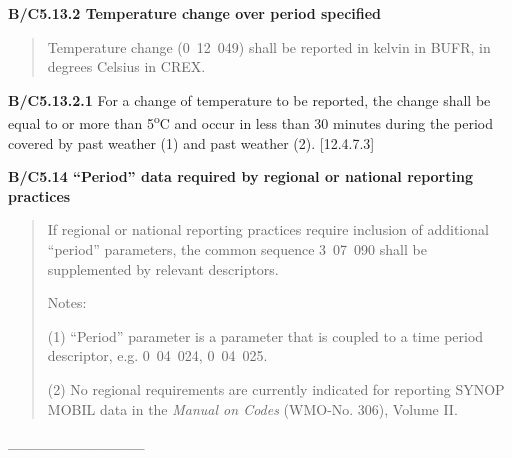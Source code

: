 \textbf{B/C5.13.2 Temperature change over period specified}

\begin{quote}
Temperature change (0~12~049) shall be reported in kelvin in BUFR, in degrees Celsius in CREX.
\end{quote}

\textbf{B/C5.13.2.1} For a change of temperature to be reported, the change shall be equal to or more than 5\textsuperscript{o}C and occur in less than 30 minutes during the period covered by past weather (1) and past weather (2). {[}12.4.7.3{]}

\textbf{B/C5.14 ``Period'' data required by regional or national reporting practices}

\begin{quote}
If regional or national reporting practices require inclusion of additional ``period'' parameters, the common sequence 3~07~090 shall be supplemented by relevant descriptors.

Notes:

(1) ``Period'' parameter is a parameter that is coupled to a time period descriptor, e.g. 0~04~024, 0~04~025.

(2) No regional requirements are currently indicated for reporting SYNOP MOBIL data in the \emph{Manual on Codes} (WMO-No. 306), Volume II.
\end{quote}

\_\_\_\_\_\_\_\_\_\_\_\_\_
